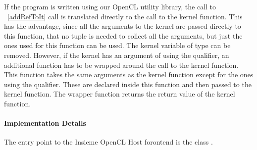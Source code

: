 If the program is written using our OpenCL utility library, the call to ~\ref{addRefToIt} call is translated directly to the call to the kernel function. This has the advantage, since all the arguments to the kernel are passed directly to this function, that no tuple is needed to collect all the arguments, but just the ones used for this function can be used. The kernel variable of type  can be removed. However, if the kernel has an argument of using the  qualifier, an additional function has to be wrapped around the call to the kernel function. This function takes the same arguments as the kernel function except for the ones using the  qualifier. These are declared inside this function and then passed to the kernel function. The wrapper function returns the return value of the kernel function. 



\paragraph{Implementation Details}

 The entry point to the Insieme OpenCL Host forontend is the class . 







